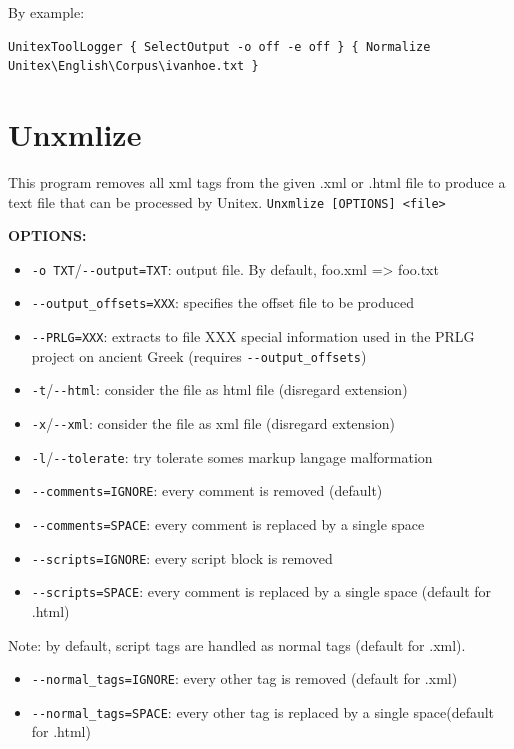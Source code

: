 \noindent By example:
\begin{verbatim}
UnitexToolLogger { SelectOutput -o off -e off } { Normalize
Unitex\English\Corpus\ivanhoe.txt }
\end{verbatim}


\section{Unxmlize}
\label{section-Unxmlize}

This program removes all xml tags from the given .xml or .html file to produce a text file that 
can be processed by Unitex.
\bigskip
\noindent
\verb+Unxmlize [OPTIONS] <file>+           

\bigskip
\noindent \textbf{OPTIONS:}
\begin{itemize}
           \item \verb+-o TXT+/\verb+--output=TXT+: output file. By default, foo.xml => foo.txt
		   \item \verb+--output_offsets=XXX+: specifies the offset file to be produced
		   \item \verb+--PRLG=XXX+: extracts to file XXX special information used in the
		               PRLG project on ancient Greek (requires \verb+--output_offsets+)
		
\bigskip 
		   \item \verb+-t+/\verb+--html+: consider the file as html file (disregard extension)
           \item \verb+-x+/\verb+--xml+: consider the file as xml file (disregard extension)
           \item \verb+-l+/\verb+--tolerate+: try tolerate somes markup langage malformation
	
\bigskip	 
		   \item \verb+--comments=IGNORE+: every comment is removed (default)
		   \item \verb+--comments=SPACE+: every comment is replaced by a single space
		   \item \verb+--scripts=IGNORE+: every script block is removed
		   \item \verb+--scripts=SPACE+: every comment is replaced by a single space (default for .html)
\end{itemize}   
  Note: by default, script tags are handled as normal tags (default for .xml).
\begin{itemize}		     
		   \item \verb+--normal_tags=IGNORE+: every other tag is removed (default for .xml)
		   \item \verb+--normal_tags=SPACE+: every other tag is replaced by a single space(default for .html)

\end{itemize}         
         


